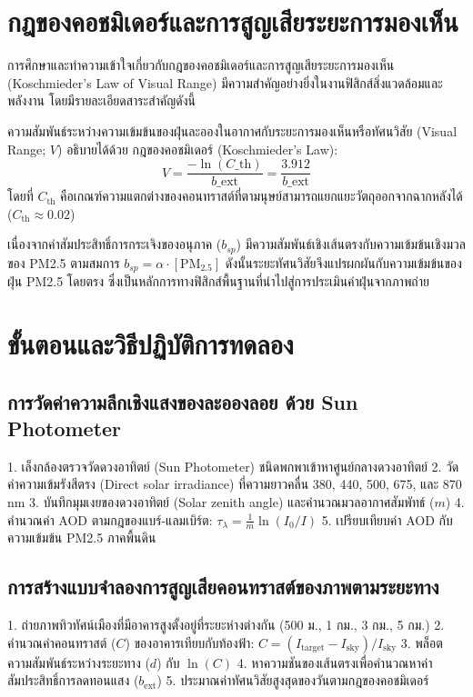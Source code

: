 \section{กฎของคอชมิเดอร์และการสูญเสียระยะการมองเห็น}

การศึกษาและทำความเข้าใจเกี่ยวกับกฎของคอชมิเดอร์และการสูญเสียระยะการมองเห็น (Koschmieder's Law of Visual Range) มีความสำคัญอย่างยิ่งในงานฟิสิกส์สิ่งแวดล้อมและพลังงาน โดยมีรายละเอียดสาระสำคัญดังนี้

ความสัมพันธ์ระหว่างความเข้มข้นของฝุ่นละอองในอากาศกับระยะการมองเห็นหรือทัศนวิสัย (Visual Range; $V$) อธิบายได้ด้วย กฎของคอชมิเดอร์ (Koschmieder's Law):
\[ V = \frac{-\ln(C\_{\text{th}})}{b\_{\text{ext}}} = \frac{3.912}{b\_{\text{ext}}} \]
โดยที่ $C_{\text{th}}$ คือเกณฑ์ความแตกต่างของคอนทราสต์ที่ตามนุษย์สามารถแยกแยะวัตถุออกจากฉากหลังได้ ($C_{\text{th}} \approx 0.02$)

เนื่องจากค่าสัมประสิทธิ์การกระเจิงของอนุภาค ($b_{sp}$) มีความสัมพันธ์เชิงเส้นตรงกับความเข้มข้นเชิงมวลของ PM2.5 ตามสมการ $b_{sp} = \alpha \cdot [\text{PM}_{2.5}]$ ดังนั้นระยะทัศนวิสัยจึงแปรผกผันกับความเข้มข้นของฝุ่น PM2.5 โดยตรง ซึ่งเป็นหลักการทางฟิสิกส์พื้นฐานที่นำไปสู่การประเมินค่าฝุ่นจากภาพถ่าย

\section{ขั้นตอนและวิธีปฏิบัติการทดลอง}

\subsection{การวัดค่าความลึกเชิงแสงของละอองลอย ด้วย Sun Photometer}
\begin{conceptbox}
1. เล็งกล้องตรวจวัดดวงอาทิตย์ (Sun Photometer) ชนิดพกพาเข้าหาศูนย์กลางดวงอาทิตย์
2. วัดค่าความเข้มรังสีตรง (Direct solar irradiance) ที่ความยาวคลื่น 380, 440, 500, 675, และ 870 nm
3. บันทึกมุมเงยของดวงอาทิตย์ (Solar zenith angle) และคำนวณมวลอากาศสัมพัทธ์ ($m$)
4. คำนวณค่า AOD ตามกฎของแบร์-แลมเบิร์ต: $\tau_\lambda = \frac{1}{m} \ln(I_0 / I)$
5. เปรียบเทียบค่า AOD กับความเข้มข้น PM2.5 ภาคพื้นดิน
\end{conceptbox}

\subsection{การสร้างแบบจำลองการสูญเสียคอนทราสต์ของภาพตามระยะทาง}
\begin{conceptbox}
1. ถ่ายภาพทิวทัศน์เมืองที่มีอาคารสูงตั้งอยู่ที่ระยะห่างต่างกัน (500 ม., 1 กม., 3 กม., 5 กม.)
2. คำนวณค่าคอนทราสต์ ($C$) ของอาคารเทียบกับท้องฟ้า: $C = (I_{\text{target}} - I_{\text{sky}}) / I_{\text{sky}}$
3. พล็อตความสัมพันธ์ระหว่างระยะทาง ($d$) กับ $\ln(C)$
4. หาความชันของเส้นตรงเพื่อคำนวณหาค่าสัมประสิทธิ์การลดทอนแสง ($b_{\text{ext}}$)
5. ประมาณค่าทัศนวิสัยสูงสุดของวันตามกฎของคอชมิเดอร์
\end{conceptbox}

